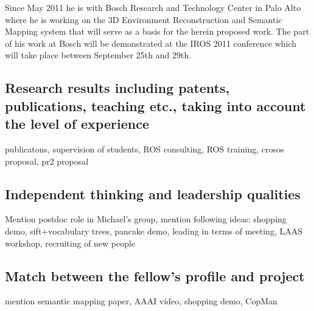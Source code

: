 Since May 2011 he is with Bosch Research and Technology Center in Palo Alto where he is working 
on the 3D Environment Reconstruction and Semantic Mapping system that will serve as a basis for
the herein proposed work. The part of his work at Bosch will be demonstrated at the IROS 2011
conference which will take place between September 25th and 29th. \\ 
\subsection{Research results including patents, publications, teaching etc., taking into account the level 
of experience} publicatons, supervision of students, ROS consulting, ROS training, crosos proposal, pr2 proposal\\
\subsection{Independent thinking and leadership qualities} 
Mention postdoc role in Michael's group, mention following ideas: shopping demo, sift+vocabulary trees, pancake demo, 
leading in terms of meeting, LAAS workshop, recruiting of new people\\
\subsection{Match between the fellow's profile and project}
mention semantic mapping paper, AAAI video, shopping demo, CopMan\\
